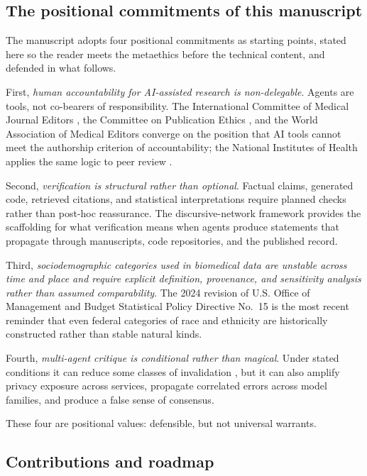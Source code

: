 \documentclass[11pt,letterpaper]{article}
\begin{document}
\subsection{The positional commitments of this manuscript}
\label{sec:intro:commitments}

The manuscript adopts four positional commitments as starting points,
stated here so the reader meets the metaethics before the technical
content, and defended in what follows.

First, \emph{human accountability for AI-assisted research is
non-delegable}. Agents are tools, not co-bearers of responsibility.
The International Committee of Medical Journal Editors
\cite{icmje_ai}, the Committee on Publication Ethics
\cite{cope_ai}, and the World Association of Medical Editors
\cite{wame2023} converge on the position that AI tools cannot
meet the authorship criterion of accountability; the National
Institutes of Health applies the same logic to peer review
\cite{nih_ai_peerreview}.

Second, \emph{verification is structural rather than optional}.
Factual claims, generated code, retrieved citations, and statistical
interpretations require planned checks rather than post-hoc
reassurance. The discursive-network framework
\cite{gutierrez2025} provides the scaffolding for what
verification means when agents produce statements that propagate
through manuscripts, code repositories, and the published record.

Third, \emph{sociodemographic categories used in biomedical data are
unstable across time and place and require explicit definition,
provenance, and sensitivity analysis rather than assumed comparability}.
The 2024 revision of U.S. Office of Management and Budget Statistical
Policy Directive No.~15 \cite{omb2024spd15} is the most recent reminder
that even federal categories of race and ethnicity are historically
constructed rather than stable natural kinds.

Fourth, \emph{multi-agent critique is conditional rather than magical}.
Under stated conditions it can reduce some classes of invalidation
\cite{gutierrez2025}, but it can also amplify privacy
exposure across services, propagate correlated errors across model
families, and produce a false sense of consensus.

These four are positional values: defensible, but not universal
warrants.

\subsection{Contributions and roadmap}
\label{sec:intro:contributions}
\end{document}
